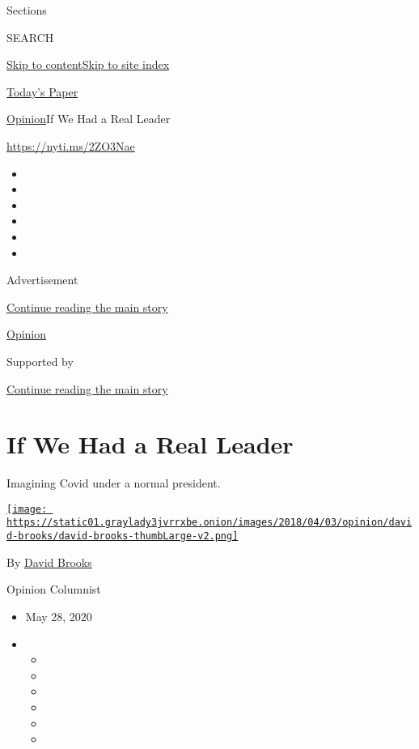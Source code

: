 Sections

SEARCH

\protect\hyperlink{site-content}{Skip to
content}\protect\hyperlink{site-index}{Skip to site index}

\href{https://myaccount.nytimes3xbfgragh.onion/auth/login?response_type=cookie\&client_id=vi}{}

\href{https://www.nytimes3xbfgragh.onion/section/todayspaper}{Today's
Paper}

\href{/section/opinion}{Opinion}\textbar{}If We Had a Real Leader

\url{https://nyti.ms/2ZO3Nae}

\begin{itemize}
\item
\item
\item
\item
\item
\item
\end{itemize}

Advertisement

\protect\hyperlink{after-top}{Continue reading the main story}

\href{/section/opinion}{Opinion}

Supported by

\protect\hyperlink{after-sponsor}{Continue reading the main story}

\hypertarget{if-we-had-a-real-leader}{%
\section{If We Had a Real Leader}\label{if-we-had-a-real-leader}}

Imagining Covid under a normal president.

\href{https://www.nytimes3xbfgragh.onion/by/david-brooks}{\texttt{[image: https://static01.graylady3jvrrxbe.onion/images/2018/04/03/opinion/david-brooks/david-brooks-thumbLarge-v2.png]}}

By \href{https://www.nytimes3xbfgragh.onion/by/david-brooks}{David
Brooks}

Opinion Columnist

\begin{itemize}
\item
  May 28, 2020
\item
  \begin{itemize}
  \item
  \item
  \item
  \item
  \item
  \item
  \end{itemize}
\end{itemize}

